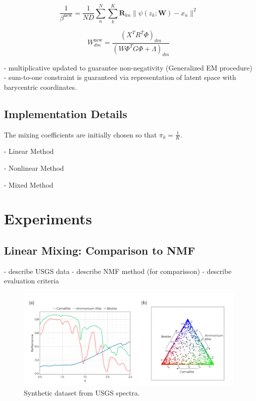 \documentclass[remotesensing,article,submit,pdftex,moreauthors]{Definitions/mdpi}
\begin{document}
\begin{equation}\label{eq:beta-update}
    \frac{1}{\beta^{\text{new}}}  = \frac{1}{ND}\sum\limits_n^N\sum\limits_k^K \mathbf{R}_{kn}\lVert \psi(z_k; \mathbf{W}) - x_n \rVert^2
\end{equation}

\begin{equation}\label{eq:W-update}
    W_{dm}^\text{new} = \dfrac{\left(X^TR^T\Phi\right)_{dm}}{\left(W\Phi^TG\Phi + \Lambda\right)_{dm}} 
\end{equation}

- multiplicative updated to guarantee non-negativity (Generalized EM procedure)
- sum-to-one constraint is guaranteed via representation of latent space with barycentric coordinates.



\subsection{Implementation Details}

The mixing coefficients are initially chosen so that $\pi_k = \frac{1}{K}$.

- Linear Method

- Nonlinear Method

- Mixed Method


\section{Experiments}\label{sec:experiments}
\subsection{Linear Mixing: Comparison to NMF}
- describe USGS data
- describe NMF method (for comparisson)
- describe evaluation criteria


\begin{figure}[H]
\includegraphics[width=\columnwidth]{methods/usgs/usgs-dataset.pdf}
\caption{Synthetic dataset from USGS spectra. \label{fig:usgs-data}}
\end{figure}  
\end{document}
